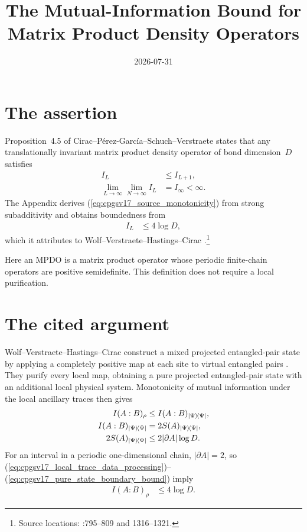 \documentclass[11pt]{article}
\title{The Mutual-Information Bound for Matrix Product Density Operators}
\author{}
\date{2026-07-31}
\begin{document}
\maketitle
{}

\section{The assertion}

Proposition~4.5 of
Cirac--P\'erez-Garc\'ia--Schuch--Verstraete
\cite{Cirac2016MPDO_arXiv} states that any translationally invariant matrix
product density operator of bond dimension~$D$ satisfies
\begin{align}
    I_L
        &\leq I_{L+1},
    \label{eq:cpgsv17_source_monotonicity}\\
    \lim_{L\to\infty}\lim_{N\to\infty} I_L
        &= I_\infty<\infty.
    \label{eq:cpgsv17_source_iterated_limit}
\end{align}
The Appendix derives (\ref{eq:cpgsv17_source_monotonicity}) from strong
subadditivity and obtains boundedness from
\begin{align}
    I_L
        &\leq 4\log D,
    \label{eq:cpgsv17_source_bond_bound}
\end{align}
which it attributes to Wolf--Verstraete--Hastings--Cirac
\cite{Wolf2008AreaLaws}.\footnote{Source locations:
:795--809 and 1316--1321.}

Here an MPDO is a matrix product operator whose periodic finite-chain
operators are positive semidefinite. This definition does not require a local
purification.

\section{The cited argument}

Wolf--Verstraete--Hastings--Cirac construct a mixed projected entangled-pair
state by applying a completely positive map at each site to virtual entangled
pairs \cite{Wolf2008AreaLaws}. They purify every local map, obtaining a pure
projected entangled-pair state with an additional local physical system.
Monotonicity of mutual information under the local ancillary traces then gives
\begin{align}
    I(A:B)_{\rho}
        &\leq I(A:B)_{|\Psi\rangle\!\langle \Psi|},
    \label{eq:cpgsv17_local_trace_data_processing}\\
    I(A:B)_{|\Psi\rangle\!\langle \Psi|}
        &= 2S(A)_{|\Psi\rangle\!\langle \Psi|},
    \label{eq:cpgsv17_pure_state_mutual_information}\\
    2S(A)_{|\Psi\rangle\!\langle \Psi|}
        &\leq 2\lvert\partial A\rvert\log D.
    \label{eq:cpgsv17_pure_state_boundary_bound}
\end{align}
For an interval in a periodic one-dimensional chain,
$\lvert\partial A\rvert=2$, so
(\ref{eq:cpgsv17_local_trace_data_processing})--%
(\ref{eq:cpgsv17_pure_state_boundary_bound}) imply
\begin{align}
    I(A:B)_{\rho}
        &\leq 4\log D.
    \label{eq:cpgsv17_locally_purified_bound}
\end{align}
\end{document}
